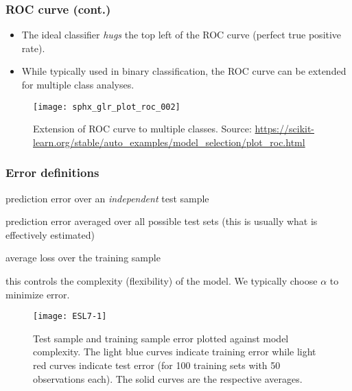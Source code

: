 \documentclass[smaller]{beamer}
\newcommand{\?}{\stackrel{?}{=}}
\newcommand{\ol}{\overline}
\newcommand{\Err}{\text{Err}}
\newcommand{\err}{\text{err}}
\begin{document}
\begin{frame}
  \frametitle{ROC curve (cont.)}
  \pause
  \begin{itemize}[<+->]
  \item The ideal classifier \textit{hugs} the top left of the ROC curve (perfect true positive rate).
  \item While typically used in binary classification, the ROC curve can be extended for multiple class analyses.
\end{itemize}
\pause
\begin{figure}[h!]
  \centering
  \texttt{[image: sphx\_glr\_plot\_roc\_002]}
  \caption{Extension of ROC curve to multiple classes. Source: \url{https://scikit-learn.org/stable/auto_examples/model_selection/plot_roc.html}}
  \label{fig:ext}
\end{figure}
\end{frame}


\begin{frame}
  \frametitle{Error definitions}\pause

  \begin{description}[widest = {tunin},leftmargin=!]
  \item[Test error, $\Err_{\tau}$] prediction error over an \textit{independent} test sample  \pause
  \item[Expected test error, $\Err$] prediction error averaged over all possible test sets (this is usually what is effectively estimated)\pause
  \item[Training error, $\ol{\err}$] average loss over the training sample\pause
  \item[Tuning parameter(s), $\alpha$] this controls the complexity (flexibility) of the model. We typically choose $\alpha$ to minimize error.
  \end{description}
  \pause

  \begin{figure}[h!]
    \centering
    \texttt{[image: ESL7-1]}
    \caption{Test sample and training sample error plotted against model complexity. The light blue curves indicate training error while light red curves indicate test error (for 100 training sets with 50 observations each). The solid curves are the respective averages.}
    \label{fig:mse}
  \end{figure}
\end{frame}
\end{document}

